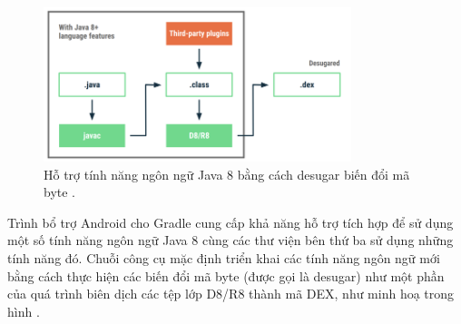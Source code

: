         \begin{figure}[H]
            \centering
            \includegraphics[width=0.8\textwidth]{images/javainandroid.png}
            \caption{Hỗ trợ tính năng ngôn ngữ Java 8 bằng cách desugar biến đổi mã byte \cite{java8}.}
            \label{fig:android2}
        \end{figure}
        
        Trình bổ trợ Android cho Gradle cung cấp khả năng hỗ trợ tích hợp để sử dụng một số tính năng ngôn ngữ Java 8 cùng các thư viện bên thứ ba sử dụng những tính năng đó. Chuỗi công cụ mặc định triển khai các tính năng ngôn ngữ mới bằng cách thực hiện các biến đổi mã byte (được gọi là desugar) như một phần của quá trình biên dịch các tệp lớp D8/R8 thành mã DEX, như minh hoạ trong hình \cite{java8}.


